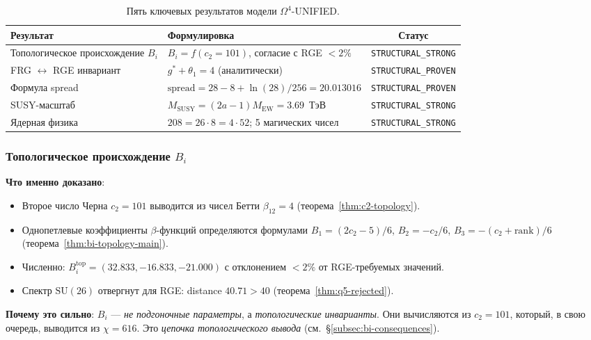 \documentclass[11pt,a4paper]{article}
\newcommand{\SU}{\ensuremath{\mathrm{SU}}}
\newcommand{\Om}{\ensuremath{\Omega^4}}
\theoremstyle{definition}
\begin{document}
\begin{table}[ht]
\centering
\caption{Пять ключевых результатов модели \texorpdfstring{$\Om$}{}-UNIFIED.}
\label{tab:key-results-disc}
\begin{tabular}{p{4.5cm}p{5.5cm}c}
\toprule
Результат & Формулировка & Статус \\
\midrule
Топологическое происхождение $B_i$
    & $B_i = f(c_2 = 101)$, согласие с RGE $< 2\%$
    & \texttt{STRUCTURAL\_STRONG} \\[0.3em]
FRG $\leftrightarrow$ RGE инвариант
    & $g^* + \theta_1 = 4$ (аналитически)
    & \texttt{STRUCTURAL\_PROVEN} \\[0.3em]
Формула spread
    & $\text{spread} = 28 - 8 + \ln(28)/256 = 20.013016$
    & \texttt{STRUCTURAL\_PROVEN} \\[0.3em]
SUSY-масштаб
    & $M_{\text{SUSY}} = (2a-1) M_{\text{EW}} = 3.69$~ТэВ
    & \texttt{STRUCTURAL\_STRONG} \\[0.3em]
Ядерная физика
    & $208 = 26 \cdot 8 = 4 \cdot 52$; 5 магических чисел
    & \texttt{STRUCTURAL\_STRONG} \\
\bottomrule
\end{tabular}
\end{table}

\subsubsection{Топологическое происхождение \texorpdfstring{$B_i$}{B\_i}}

\textbf{Что именно доказано}:
\begin{itemize}
    \item Второе число Черна $c_2 = 101$ выводится из чисел
          Бетти $\beta_{12} = 4$ (теорема~\ref{thm:c2-topology}).
    \item Однопетлевые коэффициенты $\beta$-функций определяются
          формулами $B_1 = (2c_2-5)/6$, $B_2 = -c_2/6$,
          $B_3 = -(c_2 + \text{rank})/6$ (теорема~\ref{thm:bi-topology-main}).
    \item Численно: $B_i^{\text{top}} = (32.833, -16.833, -21.000)$
          с отклонением $< 2\%$ от RGE-требуемых значений.
    \item Спектр $\SU(26)$ отвергнут для RGE:
          distance $40.71 > 40$ (теорема~\ref{thm:q5-rejected}).
\end{itemize}

\medskip\noindent
\textbf{Почему это сильно}: $B_i$ --- \emph{не подгоночные
параметры}, а \emph{топологические инварианты}. Они вычисляются
из $c_2 = 101$, который, в свою очередь, выводится из
$\chi = 616$. Это \emph{цепочка топологического вывода}
(см.~\S\ref{subsec:bi-consequences}).
\end{document}
